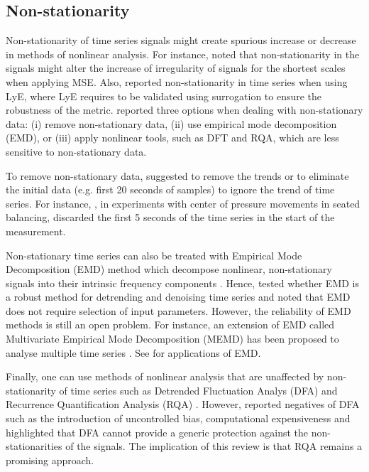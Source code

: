 \subsection{Non-stationarity}
Non-stationarity of time series signals might create
spurious increase or decrease in methods of nonlinear analysis. 
For instance, \cite{costa2007} noted that non-stationarity in 
the signals might alter the increase of irregularity of signals 
for the shortest scales when applying MSE.  
Also, \cite{dingwell2000} reported non-stationarity in time series 
when using LyE, where LyE requires to be validated using 
surrogation \citep{dingwell2000, miller2006}
to ensure the robustness of the metric. 
\cite{caballero2014} reported three options when dealing with 
non-stationary data: (i) remove non-stationary data, (ii) use empirical mode 
decomposition (EMD), or (iii) apply nonlinear tools, such as DFT and RQA, 
which are less sensitive to non-stationary data.

To remove non-stationary data, \cite{carroll1993} suggested 
to remove the trends or to eliminate the initial data 
(e.g. first 20 seconds of samples) 
to ignore the trend of time series.
For instance, \cite{vandieen2010}, in experiments with center of pressure movements 
in seated balancing, discarded the first 5 seconds of the time series 
in the start of the measurement.

Non-stationary time series can also be treated with Empirical Mode 
Decomposition (EMD) method which decompose nonlinear, non-stationary signals 
into their intrinsic frequency components \citep{huang1998, wu-huang2004, 
wu-huang2009}. Hence, \cite{flandrin2004, costa2007} tested whether EMD is a 
robust method for detrending and denoising time series and noted that 
 EMD does not require selection of input parameters. However, the reliability 
of EMD methods is still an open problem. For instance, an extension of EMD 
called Multivariate Empirical Mode Decomposition (MEMD) has been proposed 
to analyse multiple time series \citep{rehman2010, mandic2013}.
See \citep{wu-hu2006, costa2007, daubechies2011, bonnet2014, mert2018}
for applications of EMD.

Finally, one can use methods of nonlinear analysis that are unaffected 
by non-stationarity of time series such as 
Detrended Fluctuation Analys (DFA) \citep{hausdorff1995}
and Recurrence Quantification Analysis (RQA) \citep{zbilut1992, trulla1996, 
marwan2008}. 
However, \cite{bryce2012} reported negatives of DFA such as the introduction
of uncontrolled bias, computational expensiveness and highlighted  
that DFA cannot provide a generic protection against the non-stationarities 
of the signals. The implication of this review is that RQA
remains a promising approach. 

